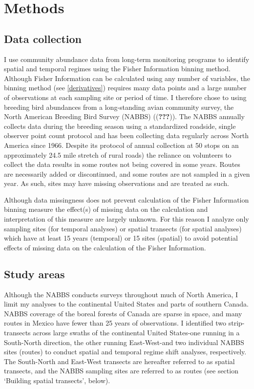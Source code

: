 \documentclass[12pt,twoside]{reedthesis}
\begin{document}
\section{Methods}\label{methods-1}

\subsection{Data collection}\label{data-collection}

I use community abundance data from long-term monitoring programs to
identify spatial and temporal regimes using the Fisher Information
binning method. Although Fisher Information can be calculated using any
number of variables, the binning method (see \ref{derivatives}) requires
many data points and a large number of observations at each sampling
site or period of time. I therefore chose to using breeding bird
abundances from a long-standing avian community survey, the North
American Breeding Bird Survey (NABBS) (({\textbf{???}})). The NABBS
annually collects data during the breeding season using a standardized
roadside, single observer point count protocol and has been collecting
data regularly across North America since 1966. Despite its protocol of
annual collection at 50 stops on an approximately 24.5 mile stretch of
rural roads) the reliance on volunteers to collect the data results in
some routes not being covered in some years. Routes are necessarily
added or discontinued, and some routes are not sampled in a given year.
As such, sites may have missing observations and are treated as such.

Although data missingness does not prevent calculation of the Fisher
Information binning measure the effect(s) of missing data on the
calculation and interpretation of this measure are largely unknown. For
this reason I analyze only sampling sites (for temporal analyses) or
spatial transects (for spatial analyses) which have at least 15 years
(temporal) or 15 sites (spatial) to avoid potential effects of missing
data on the calculation of the Fisher Information.

\subsection{Study areas}\label{study-areas}

Although the NABBS conducts surveys throughout much of North America, I
limit my analyses to the continental United States and parts of southern
Canada. NABBS coverage of the boreal forests of Canada are sparse in
space, and many routes in Mexico have fewer than 25 years of
observations. I identified two strip-transects across large swaths of
the continental United States-one running in a South-North direction,
the other running East-West-and two individual NABBS sites (routes) to
conduct spatial and temporal regime shift analyses, respectively. The
South-North and East-West transects are hereafter referred to as spatial
transects, and the NABBS sampling sites are referred to as routes (see
section `Building spatial transects', below).
\end{document}
